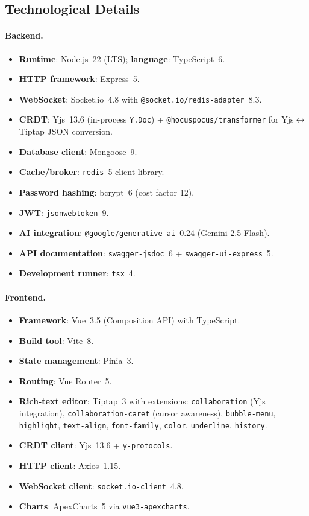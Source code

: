 \documentclass{scrartcl}
\begin{document}
  \subsection{Technological Details}\label{technological-details}

  \paragraph{Backend.}
  \begin{itemize}
    \item \textbf{Runtime}: Node.js~22 (LTS); \textbf{language}: TypeScript~6.
    \item \textbf{HTTP framework}: Express~5.
    \item \textbf{WebSocket}: Socket.io~4.8 with \texttt{@socket.io/redis-adapter}~8.3.
    \item \textbf{CRDT}: Yjs~13.6 (in-process \texttt{Y.Doc}) + \texttt{@hocuspocus/transformer}
    for Yjs$\leftrightarrow$Tiptap JSON conversion.
    \item \textbf{Database client}: Mongoose~9.
    \item \textbf{Cache/broker}: \texttt{redis}~5 client library.
    \item \textbf{Password hashing}: bcrypt~6 (cost factor 12).
    \item \textbf{JWT}: \texttt{jsonwebtoken}~9.
    \item \textbf{AI integration}: \texttt{@google/generative-ai}~0.24 (Gemini 2.5 Flash).
    \item \textbf{API documentation}: \texttt{swagger-jsdoc}~6 + \texttt{swagger-ui-express}~5.
    \item \textbf{Development runner}: \texttt{tsx}~4.
  \end{itemize}

  \paragraph{Frontend.}
  \begin{itemize}
    \item \textbf{Framework}: Vue~3.5 (Composition API) with TypeScript.
    \item \textbf{Build tool}: Vite~8.
    \item \textbf{State management}: Pinia~3.
    \item \textbf{Routing}: Vue Router~5.
    \item \textbf{Rich-text editor}: Tiptap~3 with extensions: \texttt{collaboration}
    (Yjs integration), \texttt{collaboration-caret} (cursor awareness), \texttt{bubble-menu},
    \texttt{highlight}, \texttt{text-align}, \texttt{font-family}, \texttt{color},
    \texttt{underline}, \texttt{history}.
    \item \textbf{CRDT client}: Yjs~13.6 + \texttt{y-protocols}.
    \item \textbf{HTTP client}: Axios~1.15.
    \item \textbf{WebSocket client}: \texttt{socket.io-client}~4.8.
    \item \textbf{Charts}: ApexCharts~5 via \texttt{vue3-apexcharts}.
  \end{itemize}
\end{document}
